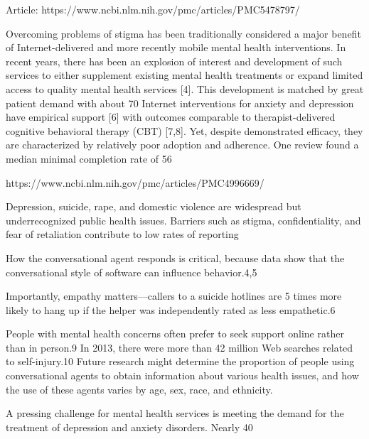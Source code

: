 Article: 
https://www.ncbi.nlm.nih.gov/pmc/articles/PMC5478797/


Overcoming problems of stigma has been traditionally considered a major benefit of Internet-delivered and more recently mobile mental health interventions. In recent years, there has been an explosion of interest and development of such services to either supplement existing mental health treatments or expand limited access to quality mental health services [4]. This development is matched by great patient demand with about 70%
Internet interventions for anxiety and depression have empirical support [6] with outcomes comparable to therapist-delivered cognitive behavioral therapy (CBT) [7,8]. Yet, despite demonstrated efficacy, they are characterized by relatively poor adoption and adherence. One review found a median minimal completion rate of 56%


https://www.ncbi.nlm.nih.gov/pmc/articles/PMC4996669/

Depression, suicide, rape, and domestic violence are widespread but underrecognized public health issues. Barriers such as stigma, confidentiality, and fear of retaliation contribute to low rates of reporting

How the conversational agent responds is critical, because data show that the conversational style of software can influence behavior.4,5 

Importantly, empathy matters—callers to a suicide hotlines are 5 times more likely to hang up if the helper was independently rated as less empathetic.6

People with mental health concerns often prefer to seek support online rather than in person.9 In 2013, there were more than 42 million Web searches related to self-injury.10 Future research might determine the proportion of people using conversational agents to obtain information about various health issues, and how the use of these agents varies by age, sex, race, and ethnicity. 

A pressing challenge for mental health services is meeting the demand for the treatment of depression and anxiety disorders. Nearly 40%

